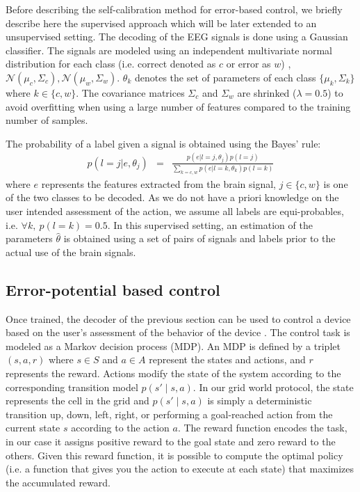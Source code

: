 \documentclass[10pt,letterpaper]{article}
\begin{document}
Before describing the self-calibration method for error-based control, we briefly describe here the supervised approach \cite{chavarriaga2010learning, iturrate13} which will be later extended to an unsupervised setting.
%
The decoding of the EEG signals is done using a Gaussian classifier.  The signals are modeled using an independent multivariate normal distribution for each class (i.e. correct denoted as $c$ or error as $w$) \cite{lotte2007review,blankertz2010single}, $\mathcal{N}(\mu_c, \Sigma_c), \mathcal{N}(\mu_w, \Sigma_w)$.  $\theta_k$ denotes  the set of parameters of each class  $\{\mu_k, \Sigma_k\}$ where $k\in\{c,w\}$.
%
The covariance matrices $\Sigma_c$ and $\Sigma_w$ are shrinked  ($\lambda = 0.5$) to avoid overfitting when using a large number of features compared to the training number of samples\cite{ledoit2004honey}. 

The probability of a label given a signal is obtained using the Bayes' rule:
%
\begin{eqnarray}
	p(l = j|e,\theta_j) &=& \frac{p(e|l = j, \theta_j)p(l = j)}{\sum_{k = c,w}{p(e|l = k,\theta_k)p(l = k)}}
\end{eqnarray}
where $e$ represents the features extracted from the brain signal, $j\in\{c,w\}$ is one of the two classes to be decoded.
%
As we do not have a priori knowledge on the user intended assessment of the action, we assume all labels are equi-probables, i.e. $\forall k,~p(l = k) = 0.5$. 
%
In this supervised setting, an estimation of the parameters $\hat{\theta}$ is obtained using a set of pairs of signals and labels prior to the actual use of the brain signals. 

\subsection{Error-potential based control}
\label{sec:errpcontrol}
Once trained, the decoder of the previous section can be used to control a device based on the user's assessment of the behavior of the device \cite{iturrate13}. 
%
The control task is modeled as a Markov decision process (MDP). An MDP is defined by a triplet $(s,a,r)$  where $s\in S$ and $a\in A$ represent the states and actions, and $r$ represents the reward.  Actions modify the state of the system according to the corresponding transition model $p(s'\mid s,a)$. In our grid world protocol, the state represents the cell in the grid and  $p(s'\mid s,a)$ is simply a deterministic transition up, down, left, right, or performing a goal-reached action from the current state $s$ according to the action $a$. The reward function encodes the task, in our case it assigns positive reward to the goal state and zero reward to the others. Given this reward function, it is possible to compute the optimal policy (i.e. a function that gives you the action to execute at each state) that maximizes the accumulated reward. 
\end{document}
